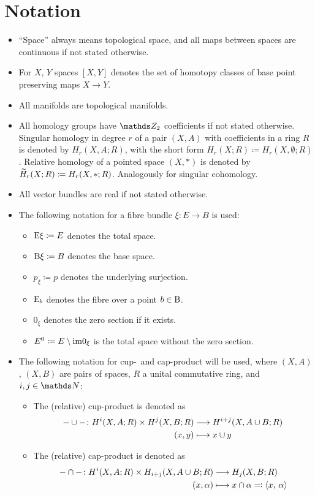 \section*{Notation}
\begin{itemize}
\item \enquote{Space} always means topological space, and all maps
  between spaces are continuous if not stated otherwise.
\item For $X$, $Y$ spaces $[X,Y]$ denotes the set of homotopy classes
  of base point preserving maps $X\to Y$.
\item All manifolds are topological manifolds.
\item All homology groups have $\Zmod2$ coefficients if not stated
  otherwise. Singular homology in degree $r$ of a pair $(X,A)$ with
  coefficients in a ring $R$ is denoted by $H_r(X,A;R)$, with the
  short form $H_r(X;R)\coloneqq H_r(X,\emptyset;R)$. Relative homology
  of a pointed space $(X,\ast)$ is denoted by $\widetilde{H}_r(X;R)\coloneqq
  H_r(X,\ast;R)$. Analogously for singular cohomology.
\item All vector bundles are real if not stated otherwise.
\item The following notation for a fibre bundle $\xi\colon E\to B$ is used:
  \begin{itemize}
  \item $\mathrm{E}\xi\coloneqq E$ denotes the total space.
  \item $\mathrm{B}\xi\coloneqq B$ denotes the base space.
  \item $p_\xi\coloneqq p$ denotes the underlying surjection.
  \item $\mathrm{E}_b$ denotes the fibre over a point $b\in \B$.
  \item $0_\xi$ denotes the zero section if it exists.
  \item ${E}^0\coloneqq E\setminus\mathrm{im}0_{\xi}$
    is the total space without the zero section.
  \end{itemize}
\item The following notation for cup-~and cap-product will be used,
  where $(X,A)$, $(X,B)$ are pairs of spaces, $R$ a unital commutative
  ring, and $i,j\in\Nat$:
  \begin{itemize}
  \item The (relative) cup-product is denoted as
    \begin{align*}
      -\cup-\colon
      H^i(X,A;R)\times H^j(X,B;R) &\longrightarrow H^{i+j}(X,A\cup B;R)\\
      (x, y) &\longmapsto x\cup y
    \end{align*}
  \item The (relative) cap-product is denoted as
    \begin{align*}
      -\cap-\colon
      H^i(X,A;R)\times H_{i+j}(X,A\cup B;R) &\longrightarrow H_j(X,B;R)\\
      (x, \alpha) &\longmapsto x\cap \alpha \eqqcolon \left\langle x,\, \alpha \right\rangle
    \end{align*}
  \end{itemize}
\end{itemize}



